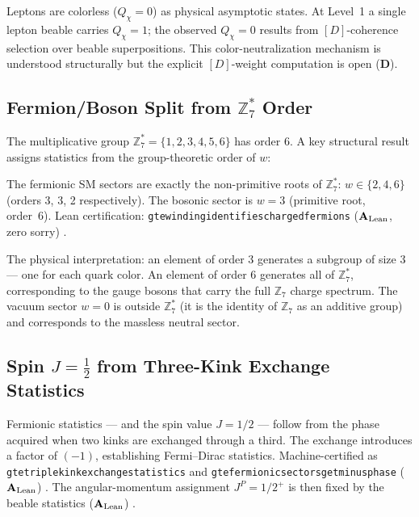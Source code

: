 \documentclass[11pt,openany]{book}
\theoremstyle{remark}
\newcommand{\ZS}{\mathbb{Z}_7}
\newcommand{\lean}[1]{%
  \penalty-100
  \begingroup\def\_{\textunderscore\allowbreak}\texttt{#1}\endgroup}
\newcommand{\CatAL}{\ensuremath{\textbf{A}_{\rm Lean}}}
\newcommand{\CatD}{\textbf{D}}
\begin{document}
Leptons are colorless ($Q_\chi = 0$) as physical asymptotic states.  At Level~1 a
single lepton beable carries $Q_\chi = 1$; the observed $Q_\chi = 0$ results from
$[D]$-coherence selection over beable superpositions.  This color-neutralization
mechanism is understood structurally but the explicit $[D]$-weight computation is
open (\CatD).

\subsection*{Fermion/Boson Split from $\ZS^*$ Order}

The multiplicative group $\ZS^* = \{1,2,3,4,5,6\}$ has order 6.  A key structural
result assigns statistics from the group-theoretic order of $w$:

\begin{tcolorbox}[colback=green!5,colframe=green!50!black,title={Theorem: Fermion/Boson Split (\CatAL)}]
The fermionic SM sectors are exactly the non-primitive roots of $\ZS^*$: $w\in\{2,4,6\}$
(orders 3, 3, 2 respectively).  The bosonic sector is $w=3$ (primitive root, order~6).
Lean certification: \lean{gte\_winding\_identifies\_charged\_fermions} (\CatAL, zero
sorry) \cite{SpivackThreeTapeCMCA,SpivackGTEPolynomialUFT}.
\end{tcolorbox}

The physical interpretation: an element of order 3 generates a subgroup of size 3 ---
one for each quark color.  An element of order 6 generates all of $\ZS^*$, corresponding
to the gauge bosons that carry the full $\ZS$ charge spectrum.  The vacuum sector
$w=0$ is outside $\ZS^*$ (it is the identity of $\ZS$ as an additive group) and
corresponds to the massless neutral sector.

\subsection*{Spin $J=\tfrac{1}{2}$ from Three-Kink Exchange Statistics}

Fermionic statistics --- and the spin value $J=1/2$ --- follow from the phase acquired
when two kinks are exchanged through a third.  The exchange introduces a factor of
$(-1)$, establishing Fermi--Dirac statistics.  Machine-certified as
\lean{gte\_triple\_kink\_exchange\_statistics} and
\lean{gte\_fermionic\_sectors\_get\_minus\_phase} (\CatAL) \cite{SpivackThreeTapeCMCA}.
The angular-momentum assignment $J^P = 1/2^+$ is then fixed by the beable statistics
(\CatAL) \cite{SpivackGTEPolynomialUFT}.
\end{document}

